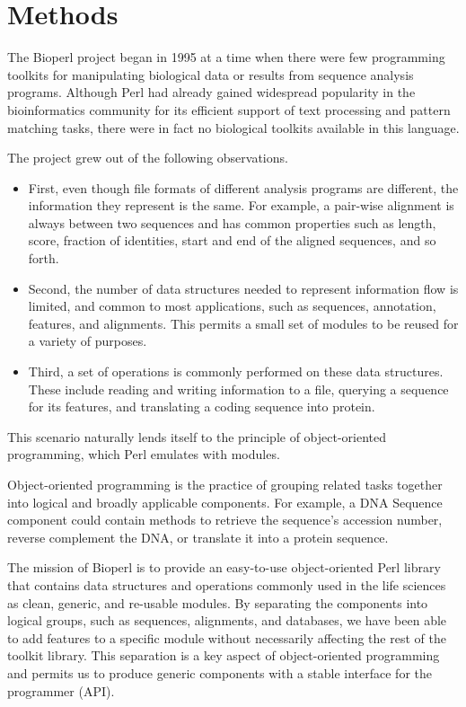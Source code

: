 \documentclass[12pt]{article}
\begin{document}
\section{Methods}

The Bioperl project began in 1995 \cite{chervitz-bits} at a time when
there were few programming toolkits for manipulating biological data
or results from sequence analysis programs.  Although Perl had already
gained widespread popularity in the bioinformatics community for its
efficient support of text processing and pattern matching tasks, there
were in fact no biological toolkits available in this language.

The project grew out of the following observations.  
\begin{itemize}

\item First, even though file formats of different analysis programs
are different, the information they represent is the same.  For
example, a pair-wise alignment is always between two sequences and has
common properties such as length, score, fraction of identities, start
and end of the aligned sequences, and so forth.

\item Second, the number of data structures needed to represent
information flow is limited, and common to most applications, such as
sequences, annotation, features, and alignments.  This permits a 
small set of modules to be reused for a variety of purposes.

\item Third, a set of operations is commonly performed on these data
structures.  These include reading and writing information to a file,
querying a sequence for its features, and translating a coding
sequence into protein.

\end{itemize}

This scenario naturally lends itself to the principle of
object-oriented programming, which Perl emulates with modules.

Object-oriented programming is the practice of grouping related tasks
together into logical and broadly applicable components.  For example, a DNA
Sequence component could contain methods to retrieve the sequence's
accession number, reverse complement the DNA, or translate it into a protein sequence.

The mission of Bioperl is to provide an easy-to-use object-oriented
Perl library that contains data structures and operations commonly
used in the life sciences as clean, generic, and re-usable modules.
By separating the components into logical groups, such as sequences,
alignments, and databases, we have been able to add features to a
specific module without necessarily affecting the rest of the toolkit
library.  This separation is a key aspect of object-oriented
programming and permits us to produce generic components with a stable
interface for the programmer (API).  
\end{document}
